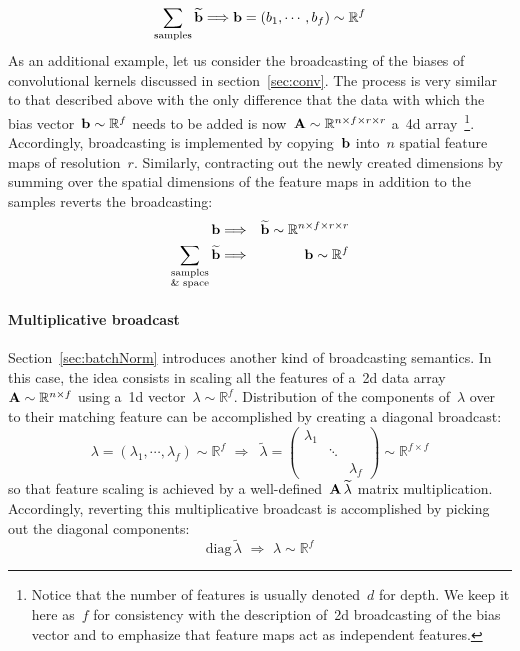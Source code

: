 \documentclass{article}
\begin{document}
\begin{appendices}
\begin{equation*}
\sum_\text{samples} \widetilde{\bf b} \Longrightarrow {\bf b} = \left( b_1 , \cdots , b_f \right) \sim \mathbb{R}^f
\end{equation*}
As an additional example, let us consider the broadcasting of the biases of convolutional kernels discussed in section~\ref{sec:conv}.  The process is very similar to that described above with the only difference that the data with which the bias vector~${\bf b} \sim \mathbb{R}^f$ needs to be added is now~${\bf A} \sim \mathbb{R}^{n\times f \times r\times r}$ a~4d array~\footnote{Notice that the number of features is usually denoted~$d$ for depth.  We keep it here as~$f$ for consistency with the description of~2d broadcasting of the bias vector and to emphasize that feature maps act as independent features.}.  Accordingly, broadcasting is implemented by copying~${\bf b}$ into~$n$ spatial feature maps of resolution~$r$.  Similarly, contracting out the newly created dimensions by summing over the spatial dimensions of the feature maps in addition to the samples reverts the broadcasting:
\begin{eqnarray*}
{\bf b} &\Longrightarrow& \widetilde{\bf b} \sim \mathbb{R}^{n\times f\times r\times r} \\
\sum_{\substack{\text{samples} \\ \text{\& space}}} \widetilde{\bf b} &\Longrightarrow& {\bf b} \sim \mathbb{R}^f
\end{eqnarray*}

\paragraph{Multiplicative broadcast} Section~\ref{sec:batchNorm} introduces another kind of broadcasting semantics.  In this case, the idea consists in scaling all the features of a~2d data array~${\bf A} \sim \mathbb{R}^{n\times f}$ using a~1d vector~$\lambda \sim \mathbb{R}^f$.  Distribution of the components of~$\lambda$ over to their matching feature can be accomplished by creating a diagonal broadcast:
\begin{equation}
\lambda = \left( \lambda_1 , \cdots , \lambda_f \right) \sim \mathbb{R}^f \,\, \Longrightarrow \,\,\, \widetilde{\lambda} = \left(
\begin{matrix}
\lambda_1 & & \\
& \ddots & \\
& & \lambda_f
\end{matrix}
\right) \sim \mathbb{R}^{f\times f}
\label{broadcast::mul}
\end{equation}
so that feature scaling is achieved by a well-defined~${\bf A} \, \widetilde{\lambda}$ matrix multiplication.  Accordingly, reverting this multiplicative broadcast is accomplished by picking out the diagonal components:
\begin{equation*}
\text{diag} \, \widetilde{\lambda} \,\, \Longrightarrow \,\, \lambda \sim \mathbb{R}^f
\end{equation*}


\end{appendices}
\end{document}
